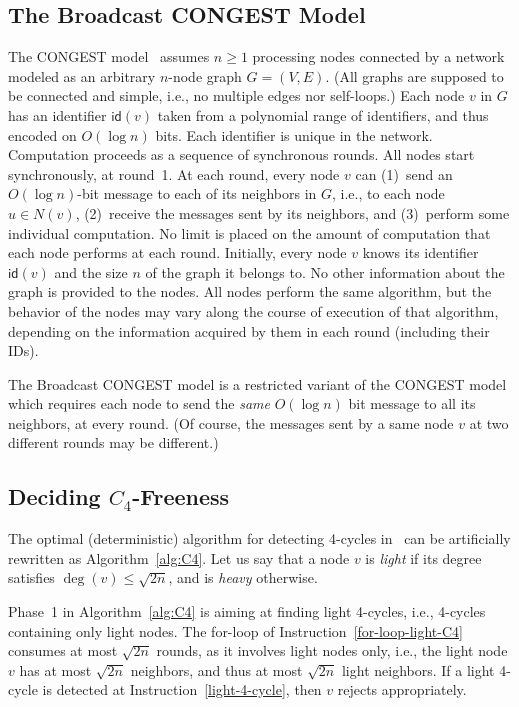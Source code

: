 \documentclass{article}
\newcommand{\id}{\mathsf{id}}
\newcommand{\CONGEST}{\textsf{CONGEST}}
\begin{document}
\subsection{The Broadcast CONGEST Model}


The \CONGEST\/ model~\cite{Peleg2000} assumes $n\geq 1$ processing nodes connected by a network modeled as an arbitrary $n$-node graph $G=(V,E)$. (All graphs are supposed to be connected and simple, i.e., no multiple edges nor self-loops.) Each node $v$ in $G$ has an identifier $\id(v)$ taken from a polynomial range of identifiers, and thus encoded on $O(\log n)$ bits. Each identifier is unique in the network. Computation proceeds as a sequence of synchronous rounds. All nodes start synchronously, at round~1. At each round, every node $v$ can (1)~send an $O(\log n)$-bit message to each of its neighbors in $G$, i.e., to each node $u\in N(v)$, (2)~receive the messages sent by its neighbors, and (3)~perform some individual computation. No limit is placed on the amount of computation that each node performs at each round. Initially, every node $v$ knows its identifier $\id(v)$ and the size $n$ of the graph it belongs to. No other information about the graph is provided to the nodes. All nodes perform the same algorithm, but the behavior of the nodes may vary along the course of execution of that algorithm, depending on the information acquired by them in each round (including their IDs). 

The Broadcast \CONGEST\/ model is a restricted variant of the \CONGEST\/ model which requires each node to send the \emph{same} $O(\log n)$ bit message to all its neighbors, at every round. (Of course, the messages sent by a same node $v$ at two different rounds may be different.)  

\subsection{Deciding $C_4$-Freeness}


The optimal (deterministic) algorithm for detecting 4-cycles in~\cite{DruckerKO13} can be artificially rewritten as Algorithm~\ref{alg:C4}. Let us say that a node $v$ is \emph{light} if its degree satisfies $\deg(v)\leq \sqrt{2n}$, and is \emph{heavy} otherwise. 

Phase~1 in Algorithm~\ref{alg:C4} is aiming at finding light 4-cycles, i.e., 4-cycles containing only light nodes. The for-loop of Instruction~\ref{for-loop-light-C4} consumes at most $\sqrt{2n}$ rounds, as it involves light nodes only, i.e., the light node $v$ has at most $\sqrt{2n}$ neighbors, and thus at most $\sqrt{2n}$ light neighbors. If a light 4-cycle is detected at Instruction~\ref{light-4-cycle}, then $v$ rejects appropriately. 
\end{document}
